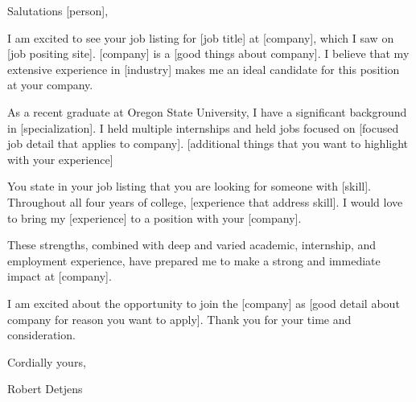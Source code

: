 \documentclass[11pt]{article} %
\begin{document}
\userinformation %

\framebreak %






\setlength{\parskip}{1em}

Salutations [person],

I am excited to see your job listing for [job title] at [company], which I saw on [job positing site]. [company] is a
[good things about company]. I believe that my extensive experience in [industry] makes me an ideal candidate for this
position at your company.

As a recent graduate at Oregon State University, I have a significant background in [specialization]. I held multiple
internships and held jobs focused on [focused job detail that applies to company]. [additional things that you want to
highlight with your experience]

You state in your job listing that you are looking for someone with [skill]. Throughout all four years of college,
[experience that address skill]. I would love to bring my [experience] to a position with your [company].

These strengths, combined with deep and varied academic, internship, and employment experience, have prepared me to make
a strong and immediate impact at [company].

I am excited about the opportunity to join the [company] as [good detail about company for reason you want to apply].
Thank you for your time and consideration.

Cordially yours,

Robert Detjens

\end{document}
